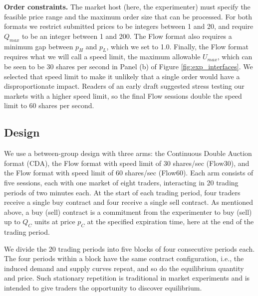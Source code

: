 \documentclass[12pt]{article}
\begin{document}
\bigskip
\noindent
\textbf{Order constraints.} 
The market host (here, the experimenter) must specify the feasible price range and the maximum order size that can be processed.
For both formats we restrict submitted prices to be integers between 1 and 20, and require $Q_{max}$ to be an integer between 1 and 200. 
The Flow format also requires a minimum gap between $p_H$ and $p_L$, which we set to 1.0. 
Finally, the Flow format requires what we will call a speed limit, the maximum allowable $U_{max}$, which can be seen to be 30 shares per second in Panel (b) of Figure \ref{fig:exp_interfaces}. 
We selected that speed limit to make it unlikely that a single order would have a disproportionate impact.
Readers of an early draft suggested stress testing our markets with a higher speed limit, so the final Flow sessions double the speed limit to 60 shares per second.


\subsection{Design}\label{sect:design}

We use a between-group design with three arms: the Continuous Double Auction format (CDA), the Flow format with speed limit of 30 shares/sec (Flow30), and the Flow format with speed limit of 60 shares/sec (Flow60).
Each arm consists of five sessions, each with one market of eight traders, interacting in 20 trading periods of two minutes each. 
At the start of each trading period,  four traders receive a single buy contract and four receive a single sell contract. %
As mentioned above, %
a buy (sell) contract is a commitment from the experimenter to buy (sell) up to $Q_{C}$ units at price $p_{C}$ at the specified expiration time, here at the end of the trading period. %


We divide the 20 trading periods into five blocks of four consecutive periods each. 
The four periods within a block have the same contract configuration, i.e., the induced demand and supply curves repeat, and so do the equilibrium quantity and price. 
Such stationary repetition is traditional in market experiments and is intended to give traders the opportunity to discover equilibrium.
\end{document}
